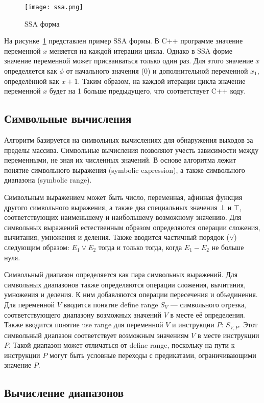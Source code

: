\begin{figure}
    \texttt{[image: ssa.png]}
    \caption{SSA форма}
    \label{fig:ssa}
\end{figure}

На рисунке~\ref{fig:ssa} представлен пример SSA формы. В C++ программе
значение переменной $x$ меняется на каждой итерации цикла. Однако в
SSA форме значение переменной может присваиваться только один раз. Для
этого значение $x$ определяется как $\phi$ от начального значения
($0$) и дополнительной переменной $x_1$, определённой как $x +
1$. Таким образом, на каждой итерации цикла значение переменной $x$
будет на 1 больше предыдущего, что соответствует C++ коду.

\subsection{Символьные вычисления}

Алгоритм базируется на символьных вычислениях для обнаружения выходов
за пределы массива. Символьные вычисления позволяют учесть зависимости
между переменными, не зная их численных значений. В основе алгоритма
лежит понятие символьного выражения (symbolic expression), а также
символьного диапазона (symbolic range).

Символьным выражением может быть число, переменная, афинная функция
другого символьного выражения, а также два специальных значения $\bot$
и $\top$, соответствующих наименьшему и наибольшему возможному
значению. Для символьных выражений естественным образом определяются
операции сложения, вычитания, умножения и деления. Также вводится
частичный порядок ($\vee$) следующим образом: $E_1 \vee E_2$ тогда и
только тогда, когда $E_1 - E_2$ не больше нуля.

Символьный диапазон определяется как пара символьных выражений. Для
символьных диапазонов также определяются операции сложения, вычитания,
умножения и деления. К ним добавляются операции пересечения и
объединения. Для переменной $V$ вводится понятие define range $S_V$
--- символьного отрезка, соответствующего диапазону возможных значений
$V$ в месте её определения. Также вводится понятие use range для
переменной $V$ и инструкции $P$: $S_{V,P}$. Этот символьный диапазон
соответствует возможным значениям $V$ в месте инструкции $P$. Такой
диапазон может отличаться от define range, поскольку на пути к
инструкции $P$ могут быть условные переходы с предикатами,
ограничивающими значение $P$.

\subsection{Вычисление диапазонов}

